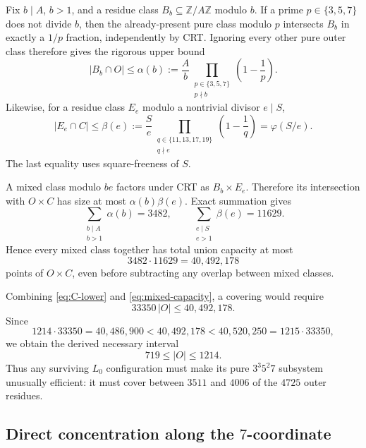\documentclass[11pt]{article}
\theoremstyle{definition}
\newcommand{\Z}{\mathbb Z}
\begin{document}
Fix $b\mid A$, $b>1$, and a residue class $B_b\subseteq\Z/A\Z$ modulo $b$.
If a prime $p\in\{3,5,7\}$ does not divide $b$, then the already-present pure class modulo $p$
intersects $B_b$ in exactly a $1/p$ fraction, independently by CRT.  Ignoring every other pure
outer class therefore gives the rigorous upper bound
\begin{equation}\label{eq:alpha-b}
 |B_b\cap O|
 \le
 \alpha(b):=
 \frac{A}{b}
 \prod_{\substack{p\in\{3,5,7\}\\p\nmid b}}
 \left(1-\frac1p\right).
\end{equation}
Likewise, for a residue class $E_e$ modulo a nontrivial divisor $e\mid S$,
\begin{equation}\label{eq:beta-e}
 |E_e\cap C|
 \le
 \beta(e):=
 \frac{S}{e}
 \prod_{\substack{q\in\{11,13,17,19\}\\q\nmid e}}
 \left(1-\frac1q\right)
 =\varphi(S/e).
\end{equation}
The last equality uses square-freeness of $S$.

A mixed class modulo $be$ factors under CRT as $B_b\times E_e$.  Therefore its intersection
with $O\times C$ has size at most $\alpha(b)\beta(e)$.  Exact summation gives
\[
 \sum_{\substack{b\mid A\\b>1}}\alpha(b)=3482,
 \qquad
 \sum_{\substack{e\mid S\\e>1}}\beta(e)=11629.
\]
Hence every mixed class together has total union capacity at most
\begin{equation}\label{eq:mixed-capacity}
 3482\cdot11629=40{,}492{,}178
\end{equation}
points of $O\times C$, even before subtracting any overlap between mixed classes.

Combining \eqref{eq:C-lower} and \eqref{eq:mixed-capacity}, a covering would require
\[
 33350\,|O|\le40{,}492{,}178.
\]
Since
\[
 1214\cdot33350=40{,}486{,}900
 <40{,}492{,}178
 <40{,}520{,}250
 =1215\cdot33350,
\]
we obtain the derived necessary interval
\begin{equation}\label{eq:O-window}
 \boxed{719\le |O|\le1214.}
\end{equation}
Thus any surviving $L_0$ configuration must make its pure $3^3 5^2 7$ subsystem unusually
efficient: it must cover between $3511$ and $4006$ of the $4725$ outer residues.

\subsection{Direct concentration along the $7$-coordinate}
\end{document}
